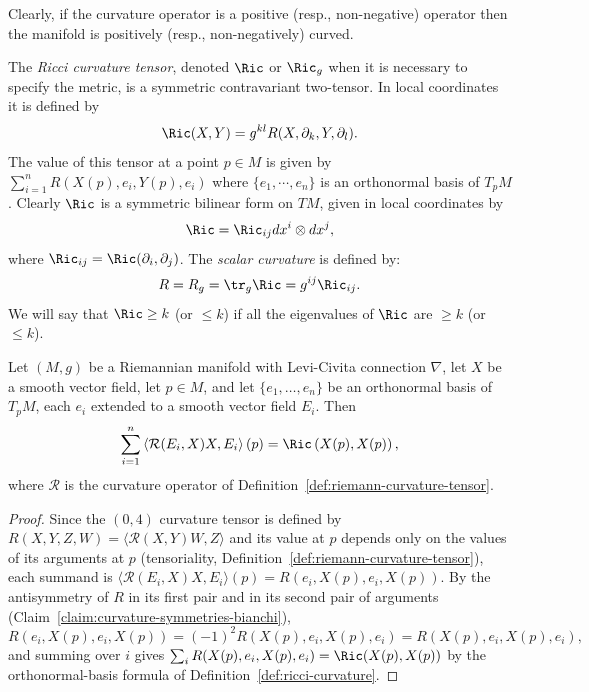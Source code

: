 Clearly, if the curvature operator is a positive (resp.,
non-negative) operator then the manifold is positively (resp.,
non-negatively) curved.


\begin{definition}
\label{def:ricci-curvature}
\leanok
The \textit{Ricci curvature tensor},
denoted $\Ric$ or $\Ric_g$ when it is necessary to specify
the metric, is a symmetric contravariant two-tensor. In local
coordinates it is defined by
\[ \Ric(X,Y)=g^{kl}R(X,\partial_k,Y,\partial_l). \]
The value of this tensor at a point $p\in M$ is  given by
$\sum_{i=1}^nR(X(p),e_i,Y(p),e_i)$ where $\{e_{1},\cdots,e_{n}\}$ is
an orthonormal basis of $T_pM$. Clearly $\Ric$ is a symmetric
bilinear form on $TM$, given in local coordinates by
$$\Ric=\Ric_{ij}dx^i\otimes dx^j,$$ where
$\Ric_{ij}=\Ric(\partial_i,\partial _j)$. The
\textit{scalar curvature} is defined by:
$$R=R_g=\tr_g \Ric=g^{ij}\Ric_{ij}.$$ We will say that $\Ric \geq
k$ (or $\leq k$) if all the eigenvalues of $\Ric$ are $\geq k$
(or $\leq k$).
\end{definition}

\begin{lemma}
\label{lem:ricci-trace-curvature-operator}
\leanok
Let $(M,g)$ be a Riemannian manifold with Levi-Civita connection
$\nabla$, let $X$ be a smooth vector field, let $p\in M$, and let
$\{e_1,\ldots,e_n\}$ be an orthonormal basis of $T_pM$, each $e_i$
extended to a smooth vector field $E_i$. Then
$$\sum_{i=1}^n\left\langle{\mathcal R}(E_i,X)X,E_i\right\rangle(p)
=\Ric\left(X(p),X(p)\right),$$
where ${\mathcal R}$ is the curvature operator of
Definition~\ref{def:riemann-curvature-tensor}.
\end{lemma}

\begin{proof}
\leanok
Since the $(0,4)$ curvature tensor is defined by
$R(X,Y,Z,W)=\langle{\mathcal R}(X,Y)W,Z\rangle$ and its value at $p$
depends only on the values of its arguments at $p$ (tensoriality,
Definition~\ref{def:riemann-curvature-tensor}), each summand is
$\langle{\mathcal R}(E_i,X)X,E_i\rangle(p)=R(e_i,X(p),e_i,X(p))$. By
the antisymmetry of $R$ in its first pair and in its second pair of
arguments (Claim~\ref{claim:curvature-symmetries-bianchi}),
$$R(e_i,X(p),e_i,X(p))=(-1)^2R(X(p),e_i,X(p),e_i)
=R(X(p),e_i,X(p),e_i),$$
and summing over $i$ gives
$\sum_iR(X(p),e_i,X(p),e_i)=\Ric(X(p),X(p))$ by the
orthonormal-basis formula of Definition~\ref{def:ricci-curvature}.
\end{proof}

